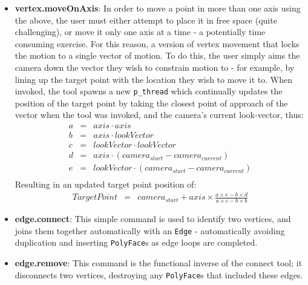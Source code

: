 \documentclass[a4paper,10pt]{article}
\begin{document}
\begin{itemize}
\item{\textbf{vertex.moveOnAxis}: In order to move a point in more than one axis using the above, the user must either attempt to place it in free space (quite challenging), or move it only one axis at a time - a potentially time consuming exercise. For this reason, a version of vertex movement that locks the motion to a single vector of motion. To do this, the user simply aims the camera down the vector they wish to constrain motion to - for example, by lining up the target point with the location they wish to move it to. When invoked, the tool spawns a new \texttt{p\_thread} which continually updates the position of the target point by taking the closest point of approach of the vector when the tool was invoked, and the camera's current look-vector, thus:
\begin{eqnarray*}
  a &=& axis \cdot axis \\
  b &=& axis \cdot lookVector \\
  c &=& lookVector \cdot lookVector \\
  d &=& axis \cdot (camera_{start} - camera_{current}) \\
  e &=& lookVector \cdot (camera_{start} - camera_{current}) \\
\end{eqnarray*}  Resulting in an updated target point position of:
\begin{eqnarray*}
  TargetPoint &=& camera_{start} + axis \times \frac{a \times e - b \times d}{a \times c - b \times b}
\end{eqnarray*}
}

\item{\textbf{edge.connect}: This simple command is used to identify two vertices, and joins them together automatically with an \texttt{Edge} - automatically avoiding duplication and inserting \texttt{PolyFace}s as edge loops are completed.}

\item{\textbf{edge.remove}: This command is the functional inverse of the connect tool; it disconnects two vertices, destroying any \texttt{PolyFace}s that included these edges.}


\end{itemize}
\end{document}
